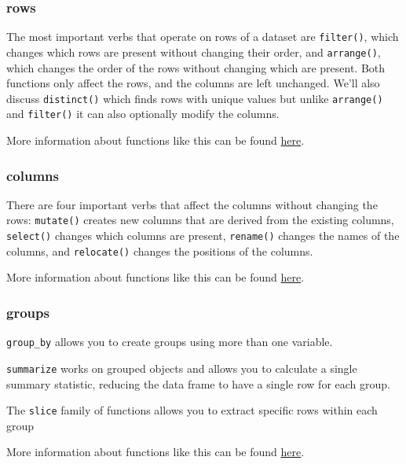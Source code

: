 \documentclass[
  letterpaper,
  DIV=11,
  numbers=noendperiod]{scrreprt}
\begin{document}
\hypertarget{rows}{%
\subsubsection{rows}\label{rows}}

The most important verbs that operate on rows of a dataset are
\texttt{filter()}, which changes which rows are present without changing
their order, and \texttt{arrange()}, which changes the order of the rows
without changing which are present. Both functions only affect the rows,
and the columns are left unchanged. We'll also discuss
\texttt{distinct()} which finds rows with unique values but unlike
\texttt{arrange()} and \texttt{filter()} it can also optionally modify
the columns.

More information about functions like this can be found
\href{https://r4ds.hadley.nz/data-transform\#rows}{here}.

\hypertarget{columns}{%
\subsubsection{columns}\label{columns}}

There are four important verbs that affect the columns without changing
the rows: \texttt{mutate()} creates new columns that are derived from
the existing columns, \texttt{select()} changes which columns are
present, \texttt{rename()} changes the names of the columns, and
\texttt{relocate()} changes the positions of the columns.

More information about functions like this can be found
\href{https://r4ds.hadley.nz/data-transform\#columns}{here}.

\hypertarget{groups}{%
\subsubsection{groups}\label{groups}}

\texttt{group\_by} allows you to create groups using more than one
variable.

\texttt{summarize} works on grouped objects and allows you to calculate
a single summary statistic, reducing the data frame to have a single row
for each group.

The \texttt{slice} family of functions allows you to extract specific
rows within each group

More information about functions like this can be found
\href{https://r4ds.hadley.nz/data-transform\#groups}{here}.
\end{document}

